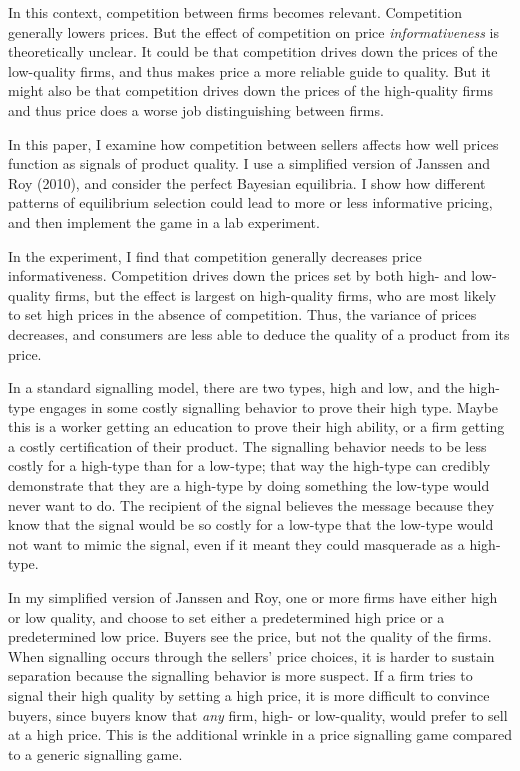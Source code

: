 \documentclass[12pt]{article}
\begin{document}
In this context, competition between firms becomes relevant. Competition generally lowers prices. But the effect of competition on price \emph{informativeness} is theoretically unclear. It could be that competition drives down the prices of the low-quality firms, and thus makes price a more reliable guide to quality. But it might also be that competition drives down the prices of the high-quality firms and thus price does a worse job distinguishing between firms.

In this paper, I examine how competition between sellers affects how well prices function as signals of product quality. I use a simplified version of Janssen and Roy (2010), and consider the perfect Bayesian equilibria. I show how different patterns of equilibrium selection could lead to more or less informative pricing, and then implement the game in a lab experiment.

In the experiment, I find that competition generally decreases price informativeness. Competition drives down the prices set by both high- and low-quality firms, but the effect is largest on high-quality firms, who are most likely to set high prices in the absence of competition. Thus, the variance of prices decreases, and consumers are less able to deduce the quality of a product from its price.

In a standard signalling model, there are two types, high and low, and the high-type engages in some costly signalling behavior to prove their high type. Maybe this is a worker getting an education to prove their high ability, or a firm getting a costly certification of their product. The signalling behavior needs to be less costly for a high-type than for a low-type; that way the high-type can credibly demonstrate that they are a high-type by doing something the low-type would never want to do. The recipient of the signal believes the message because they know that the signal would be so costly for a low-type that the low-type would not want to mimic the signal, even if it meant they could masquerade as a high-type.

In my simplified version of Janssen and Roy, one or more firms have either high or low quality, and choose to set either a predetermined high price or a predetermined low price. Buyers see the price, but not the quality of the firms. When signalling occurs through the sellers' price choices, it is harder to sustain separation because the signalling behavior is more suspect. If a firm tries to signal their high quality by setting a high price, it is more difficult to convince buyers, since buyers know that \emph{any} firm, high- or low-quality, would prefer to sell at a high price. This is the additional wrinkle in a price signalling game compared to a generic signalling game.
\end{document}
